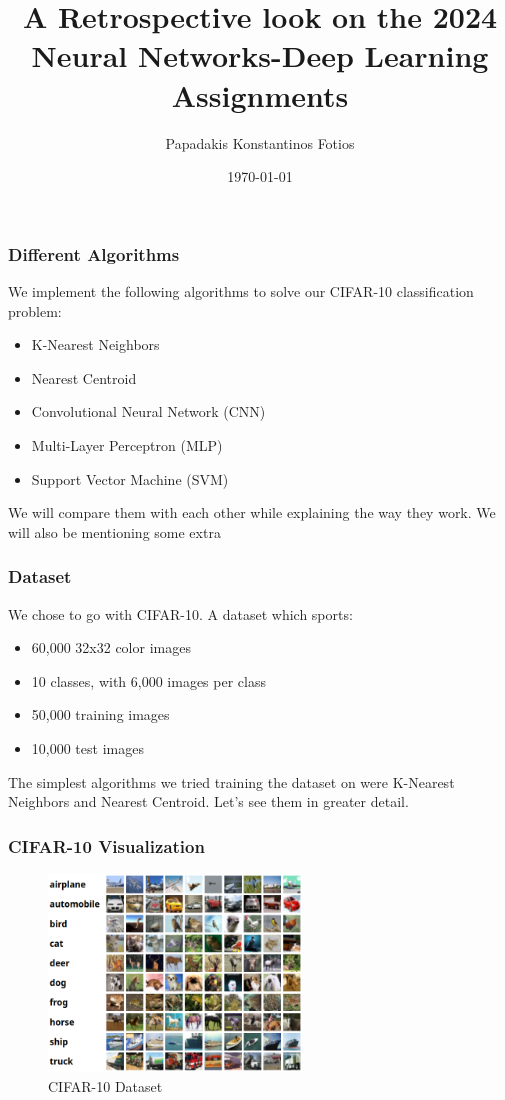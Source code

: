 \documentclass{beamer}
\title{A Retrospective look on the 2024 Neural Networks-Deep Learning Assignments}
\author{Papadakis Konstantinos Fotios}
\date{\today}
\begin{document}
\frame{\titlepage}

\begin{frame}
\frametitle{Different Algorithms}
We implement the following algorithms to solve our CIFAR-10 classification problem:
\begin{itemize}
\item K-Nearest Neighbors
\item Nearest Centroid
\item Convolutional Neural Network (CNN)
\item Multi-Layer Perceptron (MLP)
\item Support Vector Machine (SVM)
\end{itemize}
We will compare them with each other while explaining the way they work. We will also 
be mentioning some extra 
\end{frame}

\begin{frame}
    \frametitle{Dataset}
    We chose to go with CIFAR-10. A dataset which sports:
    \begin{itemize}
        \item 60,000 32x32 color images
        \item 10 classes, with 6,000 images per class
        \item 50,000 training images 
        \item 10,000 test images
    \end{itemize}
    The simplest algorithms we tried training the dataset on were K-Nearest Neighbors and 
    Nearest Centroid. Let's see them in greater detail.
\end{frame}

\begin{frame}
    \frametitle{CIFAR-10 Visualization}
    \begin{figure}
        \centering
        \includegraphics[width=0.6\textwidth]{media/cifar10_example.png}
        \caption{CIFAR-10 Dataset}
    \end{figure}
\end{frame}
\end{document}
